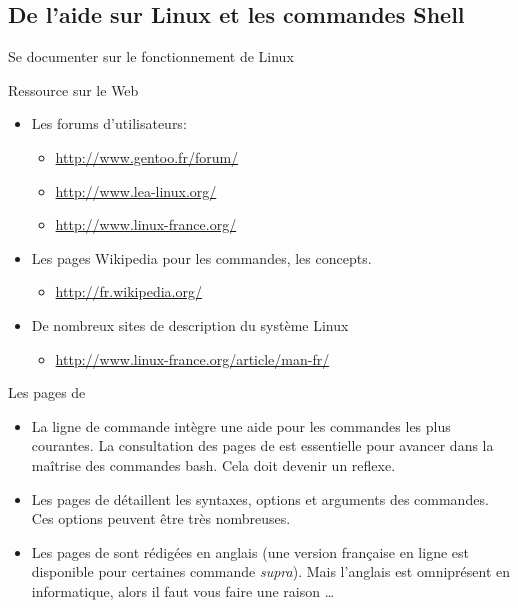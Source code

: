 \subsection{De l'aide sur Linux et les commandes Shell}
\begin{frame}{Se documenter sur le fonctionnement de Linux}
  \begin{block}{Ressource sur le Web}
    \begin{itemize}
    \item Les forums d'utilisateurs:
      \begin{itemize}
      \item \url{http://www.gentoo.fr/forum/}
      \item \url{http://www.lea-linux.org/}
      \item \url{http://www.linux-france.org/}
      \end{itemize}
    \item Les pages Wikipedia pour les commandes, les concepts.
      \begin{itemize}
      \item \url{http://fr.wikipedia.org/}
      \end{itemize}
    \item De nombreux sites de description du système Linux
      \begin{itemize}
      \item \url{http://www.linux-france.org/article/man-fr/}
      \end{itemize}
    \end{itemize}
  \end{block}
  \begin{block}{Les pages de }
    \begin{itemize}
    \item La ligne de commande intègre une aide pour les commandes les plus courantes. La consultation des pages de  est essentielle pour avancer dans la maîtrise des commandes bash. Cela doit devenir un reflexe.
    \item Les pages de  détaillent les syntaxes, options et arguments des commandes. Ces options peuvent être très nombreuses.
    \item Les pages de  sont rédigées en anglais (une version française en ligne est disponible pour certaines commande \cf \textit{supra}). Mais l'anglais est omniprésent en informatique, alors il faut vous faire une raison \dots
    \end{itemize}
  \end{block}
\end{frame}
\begin{frame}{}
  
\end{frame}
